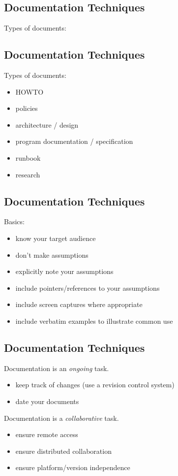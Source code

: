 \documentclass[xga]{xdvislides}
\begin{document}
\subsection{Documentation Techniques}
Types of documents:

\subsection{Documentation Techniques}
Types of documents:

\begin{itemize}
	\item HOWTO
	\item policies
	\item architecture / design
	\item program documentation / specification
	\item runbook
	\item research
\end{itemize}


\subsection{Documentation Techniques}
Basics:
\begin{itemize}
	\item know your target audience
	\item don't make assumptions
	\item explicitly note your assumptions
	\item include pointers/references to your assumptions
	\item include screen captures where appropriate
	\item include verbatim examples to illustrate common use
\end{itemize}

\subsection{Documentation Techniques}
Documentation is an {\em ongoing} task.

\begin{itemize}
	\item keep track of changes (use a revision control system)
	\item date your documents
\end{itemize}

Documentation is a {\em collaborative} task.

\begin{itemize}
	\item ensure remote access
	\item ensure distributed collaboration
	\item ensure platform/version independence
\end{itemize}
\end{document}

